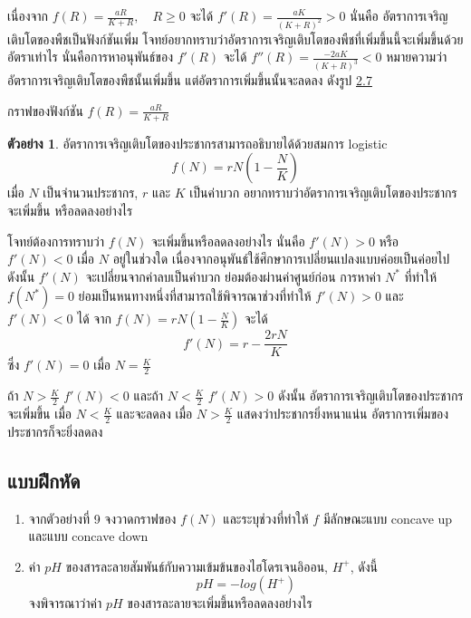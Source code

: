 \documentclass[
]{book}
\theoremstyle{definition}
\theoremstyle{definition}
\newtheorem{example}{ตัวอย่าง}[chapter]
\theoremstyle{definition}
\theoremstyle{definition}
\theoremstyle{remark}
\begin{document}
เนื่องจาก \(\displaystyle f(R)=\frac{aR}{K+R}, \quad R \ge 0\) จะได้
\(\displaystyle f'(R)=\frac{aK}{(K+R)^2}>0\) นั่นคือ
อัตราการเจริญเติบโตของพืชเป็นฟังก์ชันเพิ่ม
โจทย์อยากทราบว่าอัตราการเจริญเติบโตของพืชที่เพิ่มขึ้นนี้จะเพิ่มขึ้นด้วยอัตราเท่าไร
นั่นคือการหาอนุพันธ์ของ \(f'(R)\) จะได้
\(\displaystyle f''(R)=\frac{-2aK}{(K+R)^3}<0\)
หมายความว่าอัตราการเจริญเติบโตของพืชนั้นเพิ่มขึ้น แต่อัตราการเพิ่มขึ้นนั้นจะลดลง ดังรูป
\hyperref[fig-monod]{2.7}

กราฟของฟังก์ชัน {\(f(R)=\frac{aR}{K+R}\)}

\begin{example}
อัตราการเจริญเติบโตของประชากรสามารถอธิบายได้ด้วยสมการ logistic
\[f(N)=rN(1- \frac{N}{K})\] เมื่อ \(N\) เป็นจำนวนประชากร, \(r\) และ \(K\)
เป็นค่าบวก อยากทราบว่าอัตราการเจริญเติบโตของประชากรจะเพิ่มขึ้น หรือลดลงอย่างไร
\end{example}

โจทย์ต้องการทราบว่า \(f(N)\) จะเพิ่มขึ้นหรือลดลงอย่างไร นั่นคือ \(f'(N)>0\) หรือ
\(f'(N)<0\) เมื่อ \(N\) อยู่ในช่วงใด เนื่องจากอนุพันธ์ใช้ศึกษาการเปลี่ยนแปลงแบบค่อยเป็นค่อยไป
ดังนั้น \(f'(N)\) จะเปลี่ยนจากค่าลบเป็นค่าบวก ย่อมต้องผ่านค่าศูนย์ก่อน การหาค่า \(N^*\)
ที่ทำให้ \(f(N^*)=0\) ย่อมเป็นหนทางหนึ่งที่สามารถใช้พิจารณาช่วงที่ทำให้ \(f'(N)>0\) และ
\(f'(N)<0\) ได้ จาก \(\displaystyle f(N)=rN(1- \frac{N}{K})\) จะได้
\[f'(N)=r- \frac{2rN}{K}\] ซึ่ง \(f'(N)=0\) เมื่อ \(N = \frac{K}{2}\)

ถ้า \(\displaystyle N> \frac{K}{2}\) \(f'(N)<0\) และถ้า
\(\displaystyle N< \frac{K}{2}\) \(f'(N)>0\) ดังนั้น
อัตราการเจริญเติบโตของประชากรจะเพิ่มขึ้น เมื่อ \(\displaystyle N< \frac{K}{2}\)
และจะลดลง เมื่อ \(\displaystyle N> \frac{K}{2}\) แสดงว่าประชากรยิ่งหนาแน่น
อัตราการเพิ่มของประชากรก็จะยิ่งลดลง

\subsection{แบบฝึกหัด}\label{uxe41uxe1auxe1auxe1duxe01uxe2buxe14-5}

\begin{enumerate}
\def\labelenumi{\arabic{enumi}.}
\item
  จากตัวอย่างที่ 9 จงวาดกราฟของ \(f(N)\) และระบุช่วงที่ทำให้ \(f\) มีลักษณะแบบ
  concave up และแบบ concave down
\item
  ค่า \(pH\) ของสารละลายสัมพันธ์กับความเข้มข้นของไฮโดรเจนอิออน, \(H^+\), ดังนี้
  \[pH=-log(H^+)\] จงพิจารณาว่าค่า \(pH\) ของสารละลายจะเพิ่มขึ้นหรือลดลงอย่างไร
\end{enumerate}
\end{document}
